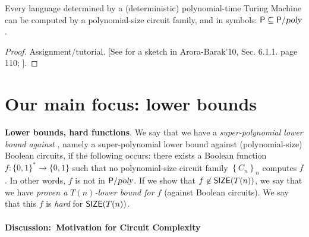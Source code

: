 \begin{theorem} Every language determined by a (deterministic) polynomial-time Turing Machine can be computed by a polynomial-size circuit  family, and in symbols: 
${\mathsf{P}} \subseteq {\ensuremath{\mathsf{P}}}/{\textsl{poly}}$.
\end{theorem}

\begin{proof}
Assignment/tutorial.
[See for a sketch in Arora-Barak'10, Sec. 6.1.1. page 110; \cite{AB09}]. 
\end{proof}

\section{Our main focus: lower bounds}

\begin{svgraybox}
\textbf{Lower bounds, hard functions}.
We say that we have a \textit{super-polynomial lower bound against \Ppoly}, namely a super-polynomial lower bound against (polynomial-size) Boolean circuits, if the following occurs: there exists a Boolean function $f:\{0,1\}^*\to \{0,1\}$ such that no polynomial-size circuit family $\left\{C_n\right\}_n$ computes $f$. In other words, $f$ is not in ${\mathsf{P}}/{\textsl{poly}}$. If we show that $f\not\in\operatorname{{\mathsf{SIZE}}}(T(n))$, we say that we have \textit{proven a $T(n)$-lower bound for $f$} (against Boolean circuits). We say that this $f$ is \emph{hard} for $\operatorname{{\mathsf{SIZE}}}(T(n))$.
\end{svgraybox}



\paragraph{Discussion:\ Motivation for Circuit Complexity}

